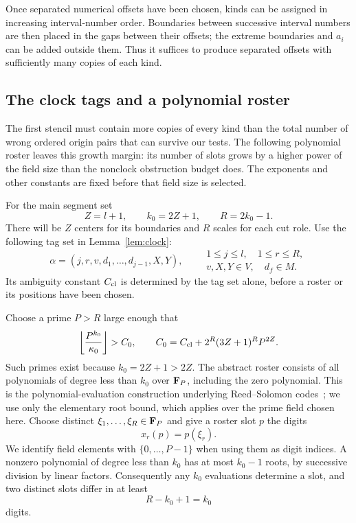 Once separated numerical offsets have been chosen, kinds can be
assigned in increasing interval-number order.  Boundaries between
successive interval numbers are then placed in the gaps between their
offsets; the extreme boundaries and $a_i$ can be added outside them.
Thus it suffices to produce separated offsets with sufficiently many
copies of each kind.

\subsection{The clock tags and a polynomial roster}

The first stencil must contain more copies of every kind than the total
number of wrong ordered origin pairs that can survive our tests. The
following polynomial roster leaves this growth margin: its number of slots
grows by a higher power of the field size than the nonclock obstruction
budget does. The exponents and other constants are fixed before that
field size is selected.

For the main segment set
\begin{equation}\label{eq:scale-counts}
             Z=l+1,\qquad k_0=2Z+1,\qquad R=2k_0-1.
\end{equation}
There will be $Z$ centers for its boundaries and $R$ scales for each
cut role.  Use the following tag set in Lemma~\ref{lem:clock}:
\begin{equation}\label{eq:clock-tags}
 \alpha=(j,r,v,d_1,\ldots,d_{j-1},X,Y),\qquad
 \begin{gathered}
 1\leq j\leq l,\quad 1\leq r\leq R,\\[-2pt]
 v,X,Y\in V,\quad d_f\in M.
 \end{gathered}
\end{equation}
Its ambiguity constant $C_{\rm cl}$ is determined by the tag set alone,
before a roster or its positions have been chosen.

Choose a prime $P>R$ large enough that
\begin{equation}\label{eq:stage0-constant}
 \left\lfloor\frac{P^{k_0}}{\kappa_0}\right\rfloor>C_0,
 \qquad
 C_0=C_{\rm cl}+2^R(3Z+1)^R P^{2Z}.
\end{equation}
Such primes exist because $k_0=2Z+1>2Z$.  The abstract roster consists
of all polynomials of degree less than $k_0$ over $\mathbf F_P$, including the
zero polynomial. This is the polynomial-evaluation construction underlying
Reed--Solomon codes~\cite{ReedSolomon1960}; we use only the elementary
root bound, which applies over the prime field chosen here.
Choose distinct $\xi_1,\ldots,\xi_R\in\mathbf F_P$ and give a
roster slot $p$ the digits
\[
                         x_r(p)=p(\xi_r).
\]
We identify field elements with $\{0,\ldots,P-1\}$ when using them as
digit indices.  A nonzero polynomial of degree less than $k_0$ has at
most $k_0-1$ roots, by successive division by linear factors.
Consequently any $k_0$ evaluations determine a slot, and two distinct
slots differ in at least
\begin{equation}\label{eq:roster-distance}
                         R-k_0+1=k_0
\end{equation}
digits.


